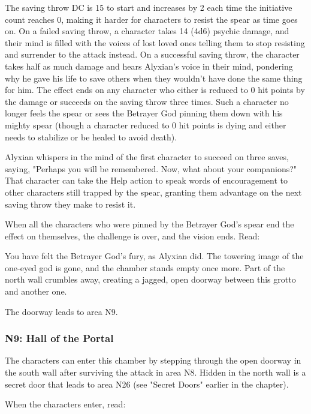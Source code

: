 \documentclass[10pt,a4paper,twoside,bg=print,twocolumn,openany,nodeprecatedcode]{dndbook}
\begin{document}
The saving throw DC is 15 to start and increases by 2 each time the initiative count reaches 0, making it harder for characters to resist the spear as time goes on. On a failed saving throw, a character takes 14 (4d6) psychic damage, and their mind is filled with the voices of lost loved ones telling them to stop resisting and surrender to the attack instead. On a successful saving throw, the character takes half as much damage and hears Alyxian's voice in their mind, pondering why he gave his life to save others when they wouldn't have done the same thing for him. The effect ends on any character who either is reduced to 0 hit points by the damage or succeeds on the saving throw three times. Such a character no longer feels the spear or sees the Betrayer God pinning them down with his mighty spear (though a character reduced to 0 hit points is dying and either needs to stabilize or be healed to avoid death).

Alyxian whispers in the mind of the first character to succeed on three saves, saying, "Perhaps you will be remembered. Now, what about your companions?" That character can take the Help action to speak words of encouragement to other characters still trapped by the spear, granting them advantage on the next saving throw they make to resist it.

When all the characters who were pinned by the Betrayer God's spear end the effect on themselves, the challenge is over, and the vision ends. Read:

\begin{DndReadAloud}{}
You have felt the Betrayer God's fury, as Alyxian did. The towering image of the one-eyed god is gone, and the chamber stands empty once more. Part of the north wall crumbles away, creating a jagged, open doorway between this grotto and another one.

\end{DndReadAloud}

The doorway leads to area N9.

\subsubsection{N9: Hall of the Portal}
The characters can enter this chamber by stepping through the open doorway in the south wall after surviving the attack in area N8. Hidden in the north wall is a secret door that leads to area N26 (see "Secret Doors" earlier in the chapter).

When the characters enter, read:
\end{document}
